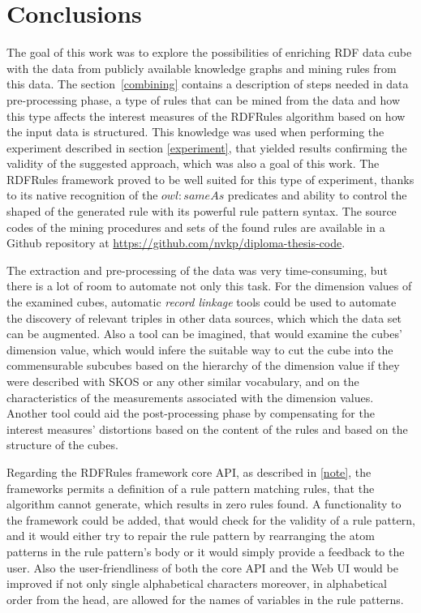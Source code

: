 \chapter*{Conclusions}

The goal of this work was to explore the possibilities of enriching RDF data cube with the data from publicly available knowledge graphs and mining rules from this data. The section~\ref{combining} contains a description of steps needed in data pre-processing phase, a type of rules that can be mined from the data and how this type affects the interest measures of the RDFRules algorithm based on how the input data is structured. This knowledge was used when performing the experiment described in section \ref{experiment}, that yielded results confirming the validity of the suggested approach, which was also a goal of this work. The RDFRules framework proved to be well suited for this type of experiment, thanks to its native recognition of the $owl:sameAs$ predicates and ability to control the shaped of the generated rule with its powerful rule pattern syntax. The source codes of the mining procedures and sets of the found rules are available in a Github repository at \href{https://github.com/nvkp/diploma-thesis-code}{https://github.com/nvkp/diploma-thesis-code}.

The extraction and pre-processing of the data was very time-consuming, but there is a lot of room to automate not only this task. For the dimension values of the examined cubes, automatic \textit{record linkage} \cite{Sheth2013} tools could be used to automate the discovery of relevant triples in other data sources, which which the data set can be augmented. Also a tool can be imagined, that would examine the cubes' dimension value, which would infere the suitable way to cut the cube into the commensurable subcubes based on the hierarchy of the dimension value if they were described with SKOS or any other similar vocabulary, and on the characteristics of the measurements associated with the dimension values. Another tool could aid the post-processing phase by compensating for the interest measures' distortions based on the content of the rules and based on the structure of the cubes. 

Regarding the RDFRules framework core API, as described in \ref{note}, the frameworks permits a definition of a rule pattern matching rules, that the algorithm cannot generate, which results in zero rules found. A functionality to the framework could be added, that would check for the validity of a rule pattern, and it would either try to repair the rule pattern by rearranging the atom patterns in the rule pattern's body or it would simply provide a feedback to the user. Also the user-friendliness of both the core API and the Web UI would be improved if not only single alphabetical characters moreover, in alphabetical order from the head, are allowed for the names of variables in the rule patterns.

